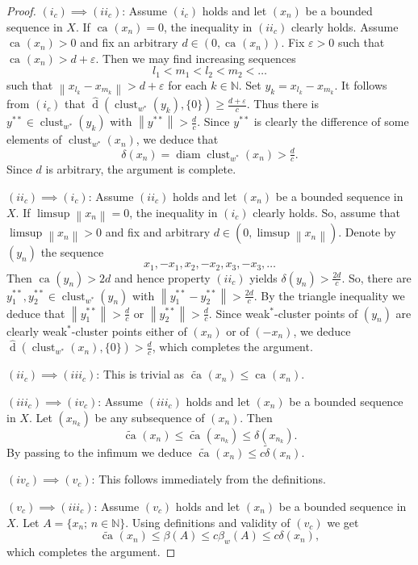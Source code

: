\documentclass{amsart}
\numberwithin{equation}{section}
\theoremstyle{definition}
\def\diam{\operatorname{diam}}
\def\ep{\varepsilon}
\def\en{\mathbb N}
\def\dh{\widehat{\operatorname{d}}}
\def\clu#1{\operatorname{clust}_{w^*}(#1)}
\def\wde#1{\widetilde{\delta}\left(#1\right)}
\def\de#1{\delta\left(#1\right)}
\newcommand{\norm}[1]{\left\|#1\right\|}
\newcommand{\ca}[2][]{\operatorname{ca}_{#1}\left(#2\right)}
\newcommand{\wca}[2][]{\widetilde{\operatorname{ca}}_{#1}\left(#2\right)}
\newcommand{\setsep}{;\,}
\begin{document}
\begin{proof}

    $(i_c)\implies(ii_c)$: Assume $(i_c)$ holds and let $(x_n)$ be a bounded sequence in $X$. If $\ca{x_n}=0$, the inequality in $(ii_c)$ clearly holds. Assume $\ca{x_n}>0$ and fix an arbitrary $d\in(0,\ca{x_n})$. Fix $\ep>0$ such that $\ca{x_n}>d+\ep$. Then we may find increasing sequences
    $$l_1<m_1<l_2<m_2<\dots$$
    such that $\norm{x_{l_k}-x_{m_k}}>d+\ep$ for each $k\in\en$. Set $y_k=x_{l_k}-x_{m_k}$. It follows from $(i_c)$ that $\dh(\clu{y_k},\{0\})\ge\frac{d+\ep}{c}$. Thus there is $y^{**}\in\clu{y_k}$ with $\norm{y^{**}}>\frac dc$. Since $y^{**}$ is clearly the difference of some elements of $\clu{x_n}$, we deduce that
    $$\de{x_n}=\diam\clu{x_n}>\tfrac dc.$$
    Since $d$ is arbitrary, the argument is complete.

     $(ii_c)\implies (i_c)$: Assume $(ii_c)$ holds and let $(x_n)$ be a bounded sequence in $X$.  If $\limsup\norm{x_n}=0$, the inequality in $(i_c)$ clearly holds. So, assume that $\limsup \norm{x_n}>0$ and fix and arbitrary $d\in (0,\limsup\norm{x_n})$. %
     Denote by $(y_n)$ the sequence
    $$x_1,-x_1,x_2,-x_2,x_3,-x_3,\dots$$
    Then $\ca{y_n}>2d$ and hence property $(ii_c)$ yields $\de{y_n}>\frac{2d}{c}$. So, there are $y_1^{**},y_2^{**}\in\clu{y_n}$ with $\norm{y_1^{**}-y_2^{**}}>\frac{2d}{c}$. By the triangle inequality 
    we deduce that $\norm{y_1^{**}}>\frac dc$ or $\norm{y_2^{**}}>\frac dc$. Since weak$^*$-cluster points of $(y_n)$ are clearly weak$^*$-cluster points either of $(x_n)$ or of $(-x_n)$, we deduce 
    $\dh(\clu{x_n},\{0\})>\frac dc$, which completes the argument.

  
    $(ii_c)\implies(iii_c)$: This is trivial as $\wca{x_n}\le \ca{x_n}$.
  
    $(iii_c)\implies(iv_c)$: Assume $(iii_c)$ holds and let $(x_n)$ be a bounded sequence in $X$. Let $(x_{n_k})$ be any subsequence of $(x_n)$. Then
    $$\wca{x_n}\le\wca{x_{n_k}}\le\de{x_{n_k}}.$$
    By passing to the infimum we deduce $\wca{x_n}\le c\wde{x_n}$.
    
    $(iv_c)\implies(v_c)$: This follows immediately from the definitions.

    $(v_c)\implies(iii_c)$: Assume $(v_c)$ holds and let $(x_n)$ be a bounded sequence in $X$.
    Let $A=\{x_{n}\setsep n\in\en\}$. Using definitions and validity of $(v_c)$ we get
    $$\wca{x_n}\le  \beta(A)\le c\beta_w(A)\le c\de{x_{n}},$$
    which completes the argument. 


\end{proof}
\end{document}
